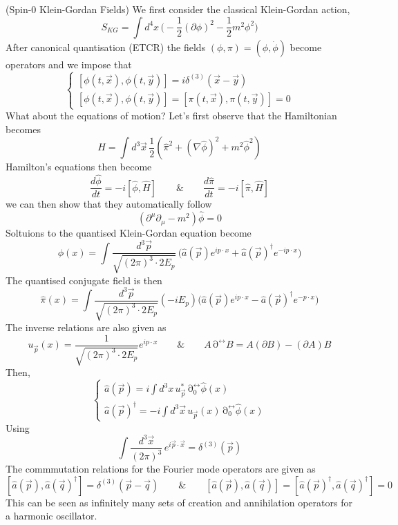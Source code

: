\vspace{2ex}
\begin{thm}
(Spin-0 Klein-Gordan Fields) We first consider the classical Klein-Gordan action, 
\[S_{KG}=\int d^{4}x\,\Big(-\dfrac{1}{2}(\partial \phi )^2-\dfrac{1}{2}m^2\phi ^2\Big)\]
After canonical quantisation (ETCR) the fields $(\phi ,\pi )=(\phi,\dot{\phi })$ become operators and we impose that
\[\begin{cases}
[\phi (t,\vec{x}),\phi (t,\vec{y})]=i\delta ^{(3)}(\vec{x}-\vec{y})\\
[\phi(t,\vec{x}),\phi (t,\vec{y})]=[\pi (t,\vec{x}),\pi(t,\vec{y})]=0
\end{cases}\]
What about the equations of motion? Let's first observe that the Hamiltonian becomes
\[\hat{H}=\int d^3\vec{x}\,\dfrac{1}{2}(\hat{\pi }^2+(\nabla \hat{\phi })^2+m^2\hat{\phi }^2)\]
Hamilton's equations then become
\[\dfrac{d \hat{\phi }}{d t}=-i[\hat{\phi },\hat{H}]\qquad\&\qquad \dfrac{d \hat{\pi }}{d t}=-i[\hat{\pi },\hat{H}]  \]
we can then show that they automatically follow
\[(\partial ^{\mu }\partial _{\mu }-m^2)\hat{\phi }=0\]
Soltuions to the quantised Klein-Gordan equation become
\[\phi (x)=\int \dfrac{d^3\vec{p}}{\sqrt{(2\pi )^3\cdot 2E_{p}}}\,\Big(\hat{a}(\vec{p})e^{ip\cdot x}+\hat{a}(\vec{p})^{\dagger}e^{-ip\cdot x}\Big)\]
The quantised conjugate field is then
\[\hat{\pi }(x)=\int \dfrac{d^3\vec{p}}{\sqrt{(2\pi )^3\cdot 2E_{p}}}(-iE_{p})\Big(\hat{a}(\vec{p})e^{ip\cdot x}-\hat{a}(\vec{p})^{\dagger}e^{-p\cdot x}\Big)\]
The inverse relations are also given as
\[u_{\vec{p}}(x)=\dfrac{1}{\sqrt{(2\pi )^3\cdot 2E_{p}}}e^{ip\cdot x}\qquad \& \qquad A\mathop{\partial }^{\leftrightarrow} B=A(\partial B)-(\partial A)B\]
Then,
\[\begin{cases}
\hat{a}(\vec{p})=i\int d^3x\,u_{\vec{p}}^{*}\mathop{\partial }^{\leftrightarrow }_{0}\hat{\phi }(x)\\
\hat{a}(\vec{p})^{\dagger}=-i\int d^3\vec{x}\,u_{\vec{p}}(x)\mathop{\partial }_{0}^{\leftrightarrow }\hat{\phi }(x)
\end{cases}\]
Using 
\[\int \dfrac{d^3\vec{x}}{(2\pi )^3}\,e^{i\vec{p}\cdot \vec{x}}=\delta ^{(3)}(\vec{p})\]
The commmutation relations for the Fourier mode operators are given as
\[[\hat{a}(\vec{p}),\hat{a}(\vec{q})^{\dagger}]=\delta ^{(3)}(\vec{p}-\vec{q})\qquad\&\qquad [\hat{a}(\vec{p}),\hat{a}(\vec{q})]=[\hat{a}(\vec{p})^{\dagger},\hat{a}(\vec{q})^{\dagger}]=0\]
This can be seen as infinitely many sets of creation and annihilation operators for a harmonic oscillator.
\end{thm}
